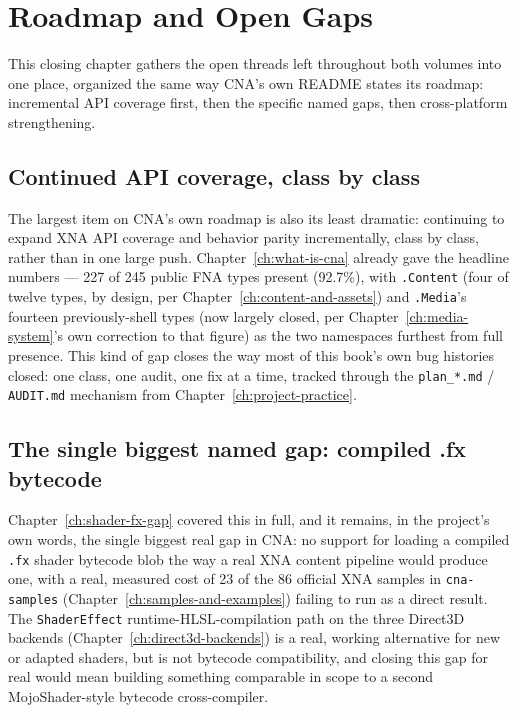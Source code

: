 \chapter{Roadmap and Open Gaps}
\label{ch:roadmap}

This closing chapter gathers the open threads left throughout both volumes into one place,
organized the same way CNA's own README states its roadmap: incremental API coverage first,
then the specific named gaps, then cross-platform strengthening.

\section{Continued API coverage, class by class}

The largest item on CNA's own roadmap is also its least dramatic: continuing to expand XNA
API coverage and behavior parity incrementally, class by class, rather than in one large
push. Chapter~\ref{ch:what-is-cna} already gave the headline numbers --- 227 of 245 public
FNA types present (92.7\%), with \texttt{.Content} (four of twelve types, by design, per
Chapter~\ref{ch:content-and-assets}) and \texttt{.Media}'s fourteen previously-shell types
(now largely closed, per Chapter~\ref{ch:media-system}'s own correction to that figure) as the
two namespaces furthest from full presence. This kind of gap closes the way most of this
book's own bug histories closed: one class, one audit, one fix at a time, tracked through the
\texttt{plan\_*.md} / \texttt{AUDIT.md} mechanism from Chapter~\ref{ch:project-practice}.

\section{The single biggest named gap: compiled .fx bytecode}

Chapter~\ref{ch:shader-fx-gap} covered this in full, and it remains, in the
project's own words, the single biggest real gap in CNA: no support for loading a compiled
\texttt{.fx} shader bytecode blob the way a real XNA content pipeline would produce one, with
a real, measured cost of 23 of the 86 official XNA samples in \texttt{cna-samples}
(Chapter~\ref{ch:samples-and-examples}) failing to run as a direct result. The
\texttt{ShaderEffect} runtime-HLSL-compilation path on the three Direct3D backends
(Chapter~\ref{ch:direct3d-backends}) is a real, working alternative for new or adapted
shaders, but is not bytecode compatibility, and closing this gap for real would mean building
something comparable in scope to a second MojoShader-style bytecode cross-compiler.

